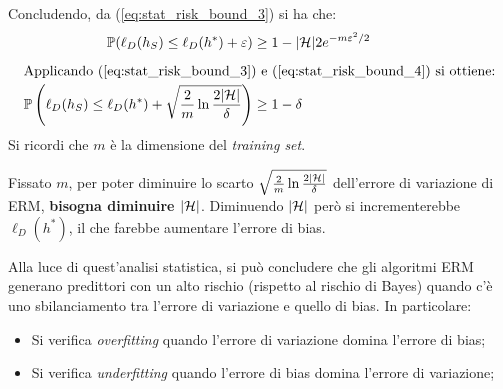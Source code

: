 Concludendo, da (\ref{eq:stat_risk_bound_3}) si ha che:
\begin{align}
\Prob(\ell_D(h_S)\leq\ell_D(h^*)+\varepsilon) &\geq 1-|\Hpred|2e^{-m\varepsilon^2/2}\notag\\[.2cm]
\multispan2{Applicando (\ref{eq:stat_risk_bound_3}) e (\ref{eq:stat_risk_bound_4})
si ottiene:\hfill}\notag\\
\Prob\left(\ell_D(h_S)\leq\ell_D(h^*)+\sqrt{\frac{2}{m}\ln{\frac{2|\Hpred|}{\delta}}}\right) 
    &\geq 1-\delta\notag
\end{align}
Si ricordi che $m$ è la dimensione del \textit{training set}.

Fissato $m$, per poter diminuire lo scarto 
$\sqrt{\frac{2}{m}\ln{\frac{2|\ensuremath{\mathcal{H}}|}{\delta}}}$ dell'errore di variazione di 
ERM, \textbf{bisogna diminuire $|\mathcal{H}|$}. Diminuendo $|\mathcal{H}|$ però si
incrementerebbe $\ell_D(h^*)$, il che farebbe aumentare l'errore di bias.

Alla luce di quest'analisi statistica, si può concludere che gli algoritmi ERM
generano predittori con un alto rischio (rispetto al rischio di Bayes) quando
c'è uno sbilanciamento tra l'errore di variazione e quello di bias.
In particolare:
\begin{itemize}
    \item Si verifica \textit{overfitting} quando l'errore di variazione domina
        l'errore di bias;
    \item Si verifica \textit{underfitting} quando l'errore di bias domina
        l'errore di variazione;
\end{itemize}